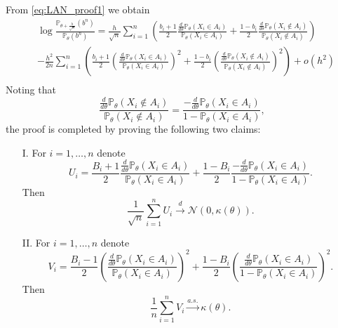 \documentclass[letterpaper, 11pt]{IEEEtran}      %
\newcommand{\Prob}{\mathbb{P} }
\newcommand{\Ncal}{\mathcal{N}}
\begin{document}
From \eqref{eq:LAN_proof1} we obtain
\begin{align*}
& \log \frac{ \Prob_{\theta + \frac{h}{\sqrt{n}}}(b^n)} { \Prob_\theta (b^n) }   = \frac{h}{\sqrt{n}} \sum_{i=1}^n  
\left( 
\frac{b_i+1}{2}  \frac{\frac{d}{d\theta} \Prob_{\theta}(X_i \in A_i)}{\Prob_{\theta}(X_i \in A_i)}  + 
 \frac{1-b_i}{2}  \frac{\frac{d}{d\theta} \Prob_{\theta}(X_i \notin A_i)}{\Prob_{\theta}(X_i \notin A_i)}   \right) \\
 & - \frac{h^2}{2n} 
 \sum_{i=1}^n 
\left( 
 \frac{b_i+1}{2} 
\left( \frac{\frac{d}{d\theta} \Prob_{\theta}(X_i \in A_i)}{\Prob_{\theta}(X_i \in A_i)}  \right)^2
+ 
 \frac{1-b_i}{2} \left( \frac{\frac{d}{d\theta} \Prob_{\theta}(X_i \notin A_i)}{\Prob_{\theta}(X_i \notin A_i)}  \right)^2 \right) + o(h^2) \\
\end{align*}
%
Noting that 
\[
\frac{\frac{d}{d\theta} \Prob_{\theta}(X_i \notin A_i)}{\Prob_{\theta}(X_i \notin A_i)} = \frac{-\frac{d}{d\theta} \Prob_{\theta}(X_i \in A_i)}{1-\Prob_{\theta}(X_i \in A_i)},
\]
the proof is completed by proving the following two claims:
\begin{itemize}
\item[I.] 
For $i=1,\ldots,n$ denote 
\[
U_i = \frac{B_i+1}{2}  \frac{\frac{d}{d\theta} \Prob_{\theta}(X_i \in A_i)}{\Prob_{\theta}(X_i \in A_i)}  + 
 \frac{1-B_i}{2}  \frac{-\frac{d}{d\theta} \Prob_{\theta}(X_i \in A_i)}{1-\Prob_{\theta}(X_i \in A_i)}. 
\]
Then 
\[
\frac{1}{\sqrt{n}} \sum_{i=1}^n U_i \overset{d}{\rightarrow} \Ncal\left(0, \kappa(\theta) \right). 
\]
\item[II.]
For $i=1,\ldots,n$ denote 
\[
V_i =  \frac{B_i-1}{2} 
\left( \frac{\frac{d}{d\theta} \Prob_{\theta}(X_i \in A_i)}{\Prob_{\theta}(X_i \in A_i)}  \right)^2
+ 
 \frac{1-B_i}{2} \left( \frac{\frac{d}{d\theta} \Prob_{\theta}(X_i \in A_i)}{1-\Prob_{\theta}(X_i \in A_i)}  \right)^2.
\]
Then 
\[
\frac{1}{n} \sum_{i=1}^n V_i \overset{a.s.}{\rightarrow} \kappa(\theta). 
\]
\end{itemize}
\end{document}
